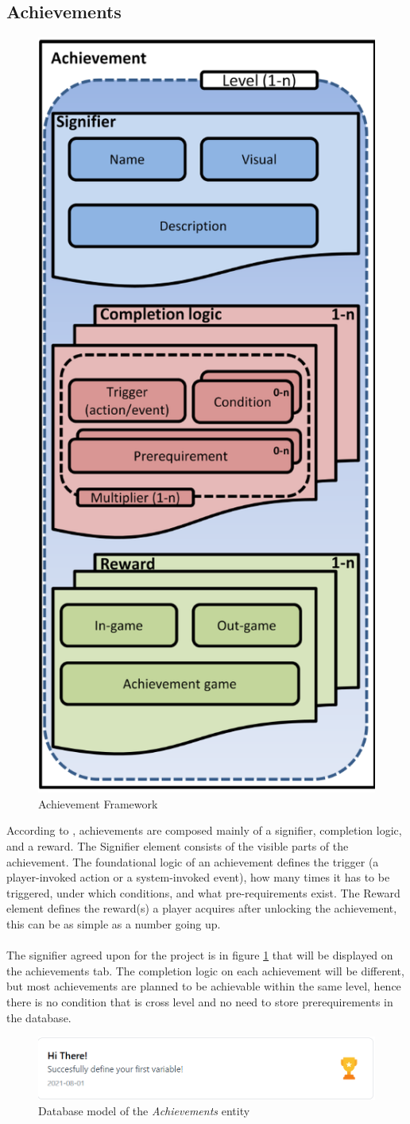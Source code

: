 \subsection{Achievements}
\begin{figure}
    \centering
    \includegraphics[width=0.5\linewidth]{images/achievement_framework.png}
    \caption{Achievement Framework\cite{hamari2011framework}}
\end{figure}
According to \cite{hamari2011framework}, achievements are composed mainly of a signifier, completion logic, and a reward. The Signifier element consists of the visible parts of the achievement. The foundational logic of an achievement defines the trigger (a player-invoked action or a system-invoked event), how many times it has to be triggered,  under which conditions, and what pre-requirements exist. The Reward element defines the reward(s) a player acquires after unlocking the achievement, this can be as simple as a number going up.
\\\\
The signifier agreed upon for the project is in figure \ref{fig:achievements} that will be displayed on the achievements tab. The completion logic on each achievement will be different, but most achievements are planned to be achievable within the same level, hence there is no condition that is cross level and no need to store prerequirements in the database.
\begin{figure}[H]
    \centering
    \includegraphics[width=0.5\linewidth]{images/example_achievement.png}
    \caption{Database model of the \textit{Achievements} entity}    
    \label{fig:achievements}
\end{figure}

